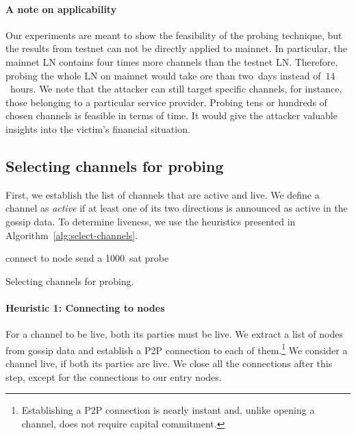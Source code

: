 \paragraph{A note on applicability}
Our experiments are meant to show the feasibility of the probing technique, but the results from testnet can not be directly applied to mainnet.
In particular, the mainnet LN contains four times more channels than the testnet LN\@.
Therefore, probing the whole LN on mainnet would take ore than two~days instead of~$14$~hours.
We note that the attacker can still target specific channels, for instance, those belonging to a particular service provider.
Probing tens or hundreds of chosen channels is feasible in terms of time.
It would give the attacker valuable insights into the victim's financial situation.


\subsection{Selecting channels for probing}

First, we establish the list of channels that are active and live.
We define a channel as \textit{active} if at least one of its two directions is announced as active in the gossip data.
To determine liveness, we use the heuristics presented in Algorithm~\ref{alg:select-channels}.

\begin{algorithm}
	 {
		connect to node\;
	}
	 {
		send a 1000~sat probe\;
	}
	\caption{Selecting channels for probing.}
	\label{alg:select-channels}
\end{algorithm}

\paragraph{Heuristic 1: Connecting to nodes}
For a channel to be live, both its parties must be live.
We extract a list of nodes from gossip data and establish a P2P connection to each of them.\footnote{Establishing a P2P connection is nearly instant and, unlike opening a channel, does not require capital commitment.}
We consider a channel live, if both its parties are live.
We close all the connections after this step, except for the connections to our entry nodes.

